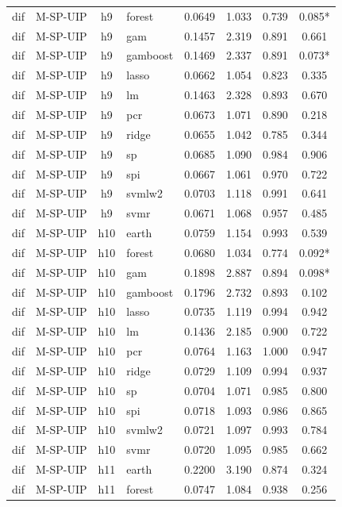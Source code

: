 \begin{ThreePartTable}
\begin{longtable}[t]{llclcccc}
dif & M-SP-UIP & h9 & forest & 0.0649 & 1.033 & 0.739 & 0.085*\\
dif & M-SP-UIP & h9 & gam & 0.1457 & 2.319 & 0.891 & 0.661\\
dif & M-SP-UIP & h9 & gamboost & 0.1469 & 2.337 & 0.891 & 0.073*\\
dif & M-SP-UIP & h9 & lasso & 0.0662 & 1.054 & 0.823 & 0.335\\
dif & M-SP-UIP & h9 & lm & 0.1463 & 2.328 & 0.893 & 0.670\\
dif & M-SP-UIP & h9 & pcr & 0.0673 & 1.071 & 0.890 & 0.218\\
dif & M-SP-UIP & h9 & ridge & 0.0655 & 1.042 & 0.785 & 0.344\\
dif & M-SP-UIP & h9 & sp & 0.0685 & 1.090 & 0.984 & 0.906\\
dif & M-SP-UIP & h9 & spi & 0.0667 & 1.061 & 0.970 & 0.722\\
dif & M-SP-UIP & h9 & svmlw2 & 0.0703 & 1.118 & 0.991 & 0.641\\
dif & M-SP-UIP & h9 & svmr & 0.0671 & 1.068 & 0.957 & 0.485\\
\addlinespace
dif & M-SP-UIP & h10 & earth & 0.0759 & 1.154 & 0.993 & 0.539\\
dif & M-SP-UIP & h10 & forest & 0.0680 & 1.034 & 0.774 & 0.092*\\
dif & M-SP-UIP & h10 & gam & 0.1898 & 2.887 & 0.894 & 0.098*\\
dif & M-SP-UIP & h10 & gamboost & 0.1796 & 2.732 & 0.893 & 0.102\\
dif & M-SP-UIP & h10 & lasso & 0.0735 & 1.119 & 0.994 & 0.942\\
dif & M-SP-UIP & h10 & lm & 0.1436 & 2.185 & 0.900 & 0.722\\
dif & M-SP-UIP & h10 & pcr & 0.0764 & 1.163 & 1.000 & 0.947\\
dif & M-SP-UIP & h10 & ridge & 0.0729 & 1.109 & 0.994 & 0.937\\
dif & M-SP-UIP & h10 & sp & 0.0704 & 1.071 & 0.985 & 0.800\\
dif & M-SP-UIP & h10 & spi & 0.0718 & 1.093 & 0.986 & 0.865\\
dif & M-SP-UIP & h10 & svmlw2 & 0.0721 & 1.097 & 0.993 & 0.784\\
dif & M-SP-UIP & h10 & svmr & 0.0720 & 1.095 & 0.985 & 0.662\\
\addlinespace
dif & M-SP-UIP & h11 & earth & 0.2200 & 3.190 & 0.874 & 0.324\\
dif & M-SP-UIP & h11 & forest & 0.0747 & 1.084 & 0.938 & 0.256\\

\end{longtable}
\end{ThreePartTable}

